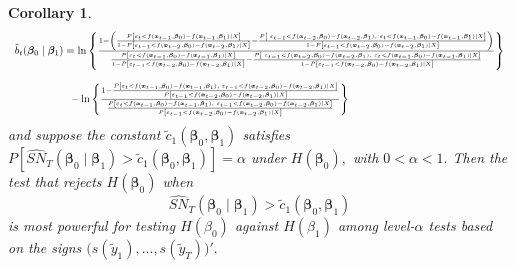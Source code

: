 \documentclass[harvard,11pt]{article}
\newtheorem{corollary}{Corollary}
\begin{document}
\begin{corollary}
\begin{equation*}
\begin{tabular}{l}
$\tilde{b}_{t}(\bm{\beta}_{0}\mid\bm{\beta}_{1})=\ln \left\{ \frac{1-\left( \frac{%
P\left[ \varepsilon_{t}<f(\bm{x}_{t-1},\bm{\beta}_{0})-f(\bm{x}_{t-1},\bm{\beta}_{1})\mid X\right] }{%
1-P\left[ \varepsilon_{t-1}<f(\bm{x}_{t-2},\bm{\beta}_{0})-f(\bm{x}_{t-2},\bm{\beta}
_{1})\mid X\right] }-\frac{P\left[ \text{ }\varepsilon_{t-1}<f(\bm{x}_{t-2},\bm{\beta}
_{0})-f(\bm{x}_{t-2},\bm{\beta}_{1}),\text{ }\varepsilon_{t}<f(\bm{x}_{t-1},\bm{\beta}
_{0})-f(\bm{x}_{t-1},\bm{\beta}_{1})\mid X\right] }{1-P\left[
\varepsilon_{t-1}<f(\bm{x}_{t-2},\bm{\beta}_{0})-f(\bm{x}_{t-2},\bm{\beta}_{1})\mid X\right] }\right) }{\frac{%
P\left[ \varepsilon_{t}<f(\bm{x}_{t-1},\bm{\beta}_{0})-f(\bm{x}_{t-1},\bm{\beta}_{1})\mid X\right] }{%
1-P\left[ \varepsilon_{t-1}<f(\bm{x}_{t-2},\bm{\beta}_{0})-f(\bm{x}_{t-2},\bm{\beta}
_{1})\mid X\right] }-\frac{P\left[ \text{ }\varepsilon_{t-1}<f(\bm{x}_{t-2},\bm{\beta}
_{0})-f(\bm{x}_{t-2},\bm{\beta}_{1}),\text{ }\varepsilon_{t}<f(\bm{x}_{t-1},\bm{\beta}
_{0})-f(\bm{x}_{t-1},\bm{\beta}_{1})\mid X\right] }{1-P\left[
\varepsilon_{t-1}<f(\bm{x}_{t-2},\bm{\beta}_{0})-f(\bm{x}_{t-2},\bm{\beta}_{1})\mid X\right] }}\right\} $ \\ 
\ \ \ \ \ \ \ \ \ \ \ \ \ \ \  \\ 
\ \ \ \ \ \ \ \ \ \ \ \ \ \ \ \ $-\ln \left\{ \frac{1-\frac{P\left[
\varepsilon_{t}<f(\bm{x}_{t-1},\bm{\beta}_{0})-f(\bm{x}_{t-1},\bm{\beta}_{1}),\text{ }%
\varepsilon_{t-1}<f(\bm{x}_{t-2},\bm{\beta}_{0})-f(\bm{x}_{t-2},\bm{\beta}_{1})\mid X\right] }{P%
\left[ \varepsilon_{t-1}<f(\bm{x}_{t-2},\bm{\beta}_{0})-f(\bm{x}_{t-2},\bm{\beta}_{1})\mid X\right] }}{\frac{%
P\left[ \varepsilon_{t}<f(\bm{x}_{t-1},\bm{\beta}_{0})-f(\bm{x}_{t-1},\bm{\beta}_{1}),\text{ }%
\varepsilon_{t-1}<f(\bm{x}_{t-2},\bm{\beta}_{0})-f(\bm{x}_{t-2},\bm{\beta}_{1})\mid X\right] }{P%
\left[ \varepsilon_{t-1}<f(\bm{x}_{t-2},\bm{\beta}_{0})-f(\bm{x}_{t-2},\bm{\beta}_{1})\mid X\right] }}\right\} 
$%
\end{tabular}%
\end{equation*}%
and suppose the constant $\tilde{c}_{1}(\bm{\beta}_{0},\bm{\beta}_{1})$ satisfies $%
P\left[ \widehat{SN}_{T}(\bm{\beta}_{0}\mid\bm{\beta}_{1})>\tilde{c}_{1}(\bm{\beta}
_{0},\bm{\beta}_{1})\right] =\alpha $ under $H(\bm{\beta}_{0}),$ with $0<\alpha <1.$
Then the test that rejects $H(\bm{\beta}_{0})$ when 
\begin{equation*}
\widehat{SN}_{T}(\bm{\beta}_{0}\mid\bm{\beta}_{1})>\tilde{c}_{1}(\bm{\beta}_{0},\bm{\beta}_{1})
\end{equation*}%
is most powerful for testing $H(\beta _{0})$ against $H(\beta _{1})$ among
level-$\alpha $ tests based on the signs $\big(s(\tilde{y}_{1}),...,s(\tilde{y}_{T})\big)'.$
\end{corollary}
\end{document}
